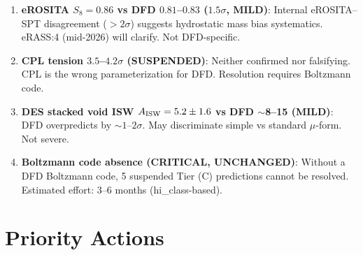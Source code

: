 \documentclass[11pt,a4paper]{article}
\begin{document}
\begin{tensionbox}

\begin{enumerate}[nosep]

\item \textbf{eROSITA $S_8 = 0.86$ vs DFD $0.81$--$0.83$ ($1.5\sigma$,
  MILD)}:
  Internal eROSITA--SPT disagreement ($> 2\sigma$) suggests hydrostatic
  mass bias systematics. eRASS:4 (mid-2026) will clarify. Not
  DFD-specific.

\item \textbf{CPL tension $3.5$--$4.2\sigma$ (SUSPENDED)}:
  Neither confirmed nor falsifying. CPL is the wrong parameterization
  for DFD. Resolution requires Boltzmann code.

\item \textbf{DES stacked void ISW $A_{\rm ISW} = 5.2 \pm 1.6$ vs
  DFD $\sim$8--15 (MILD)}:
  DFD overpredicts by $\sim 1$--$2\sigma$. May discriminate simple
  vs standard $\mu$-form. Not severe.

\item \textbf{Boltzmann code absence (CRITICAL, UNCHANGED)}:
  Without a DFD Boltzmann code, 5 suspended Tier (C) predictions
  cannot be resolved. Estimated effort: 3--6 months (hi\_class-based).

\end{enumerate}

\end{tensionbox}


\section{Priority Actions}
\label{sec:actions}
\end{document}
